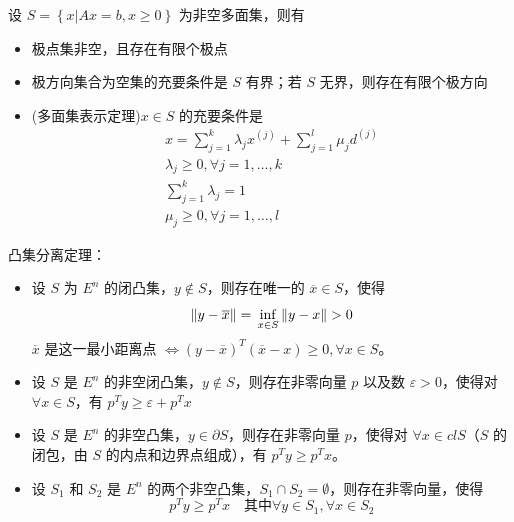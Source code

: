 \begin{remark}
    设 $S = \left\{x | Ax = b, x \ge 0\right\}$ 为非空多面集，则有
    \begin{itemize}
        \item 极点集非空，且存在有限个极点
        \item 极方向集合为空集的充要条件是 $S$ 有界；若 $S$ 无界，则存在有限个极方向
        \item (多面集表示定理)$x \in S$ 的充要条件是 \begin{gather*}
            x = \sum_{j = 1}^k \lambda_j x^{(j)} + \sum_{j = 1}^l \mu_j d^{(j)}\\
            \lambda_j \ge 0, \forall j = 1, \dots, k\\
            \sum_{j = 1}^k \lambda_j = 1\\
            \mu_j \ge 0, \forall j = 1, \dots, l
        \end{gather*}
    \end{itemize}
\end{remark}

\begin{remark}
    凸集分离定理：
    \begin{itemize}
        \item 设 $S$ 为 $E^n$ 的闭凸集，$y\notin S$，则存在唯一的 $\overline{x} \in S$，使得\[ \|y - \overline{x}\| = \sideset{}{}{\operatorname{inf}}_{x \in S}\|y - x\| > 0 \]
        $\overline{x}$ 是这一最小距离点 $\Leftrightarrow (y - \overline{x})^T(\overline{x} - x) \ge 0, \forall x \in S$。

        \item 设 $S$ 是 $E^n$ 的非空闭凸集，$y\notin S$，则存在非零向量 $p$ 以及数 $\varepsilon > 0$，使得对 $\forall x \in S$，有 $p^T y \ge \varepsilon + p^T x$
        
        \item 设 $S$ 是 $E^n$ 的非空凸集，$y\in \partial S$，则存在非零向量 $p$，使得对 $\forall x \in clS$（$S$ 的闭包，由 $S$ 的内点和边界点组成），有 $p^Ty \ge p^Tx$。
        
        \item 设 $S_1$ 和 $S_2$ 是 $E^n$ 的两个非空凸集，$S_1 \cap S_2 = \emptyset$，则存在非零向量，使得\[p^Ty \ge p^T x \quad \text{其中}\forall y \in S_1, \forall x \in S_2\]
    \end{itemize}
\end{remark}

